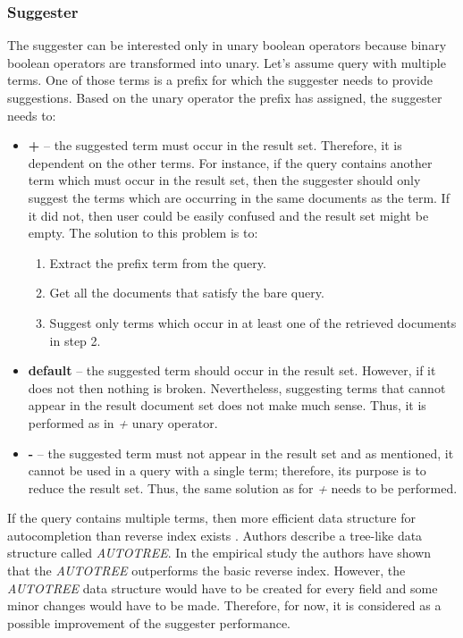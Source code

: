 \subsubsection{Suggester}
The suggester can be interested only in unary boolean operators because binary boolean operators are transformed into unary.
Let's assume query with multiple terms. One of those terms is a prefix for which the suggester needs to provide suggestions.
Based on the unary operator the prefix has assigned, the suggester needs to:
\begin{itemize}
    \item \textbf{+} – the suggested term must occur in the result set. Therefore, it is dependent on the other terms.
    For instance, if the query contains another term which must occur in the result set, then the suggester should only
    suggest the terms which are occurring in the same documents as the term. If it did not, then user could be easily
    confused and the result set might be empty. The solution to this problem is to:
    \begin{enumerate}
        \item Extract the prefix term from the query.
        \item Get all the documents that satisfy the bare query.
        \item Suggest only terms which occur in at least one of the retrieved documents in step 2.
    \end{enumerate}
    \item \textbf{default} – the suggested term should occur in the result set. However, if it does not then nothing is broken.
    Nevertheless, suggesting terms that cannot appear in the result document set does not make much sense. Thus, it is performed
    as in \textit{+} unary operator.
    \item \textbf{-} – the suggested term must not appear in the result set and as mentioned, it cannot be used in a
    query with a single term; therefore, its purpose is to reduce the result set. Thus, the same solution as for \textit{+}
    needs to be performed.
\end{itemize}


If the query contains multiple terms, then more efficient data structure for autocompletion than reverse index exists
\citep{Bast06output-sensitiveautocompletion}. Authors describe a tree-like data structure called \textit{AUTOTREE}. In the
empirical study the authors have shown that the \textit{AUTOTREE} outperforms the basic reverse index. However,
the \textit{AUTOTREE} data structure would have to be created for every field and some minor changes would have to be made.
Therefore, for now, it is considered as a possible improvement of the suggester performance.

